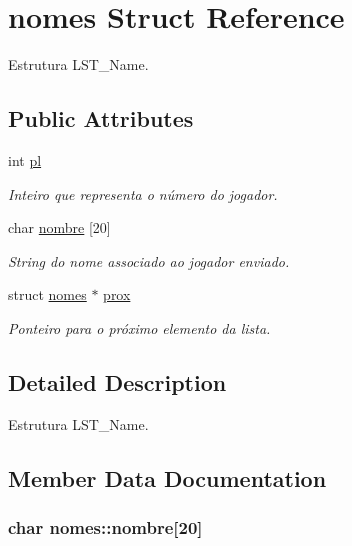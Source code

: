 \hypertarget{structnomes}{\section{nomes Struct Reference}
\label{structnomes}
}


Estrutura L\+S\+T\+\_\+\+Name.  


\subsection*{Public Attributes}
\begin{DoxyCompactItemize}
\item 
int \hyperlink{structnomes_a182964ec5b7c9d96a8f16f78318ac11a}{pl}
\begin{DoxyCompactList}\small\item\em Inteiro que representa o número do jogador. \end{DoxyCompactList}\item 
char \hyperlink{structnomes_aa4afe3d0bdccac3489f69641c1752e0e}{nombre} \mbox{[}20\mbox{]}
\begin{DoxyCompactList}\small\item\em String do nome associado ao jogador enviado. \end{DoxyCompactList}\item 
struct \hyperlink{structnomes}{nomes} $\ast$ \hyperlink{structnomes_ade6bd8ebe71f4a7b1118639da56e67cf}{prox}
\begin{DoxyCompactList}\small\item\em Ponteiro para o próximo elemento da lista. \end{DoxyCompactList}\end{DoxyCompactItemize}


\subsection{Detailed Description}
Estrutura L\+S\+T\+\_\+\+Name. 



\subsection{Member Data Documentation}
\hypertarget{structnomes_aa4afe3d0bdccac3489f69641c1752e0e}{
\subsubsection[{nombre}]{\setlength{\rightskip}{0pt plus 5cm}char nomes\+::nombre\mbox{[}20\mbox{]}}}\label{structnomes_aa4afe3d0bdccac3489f69641c1752e0e}


